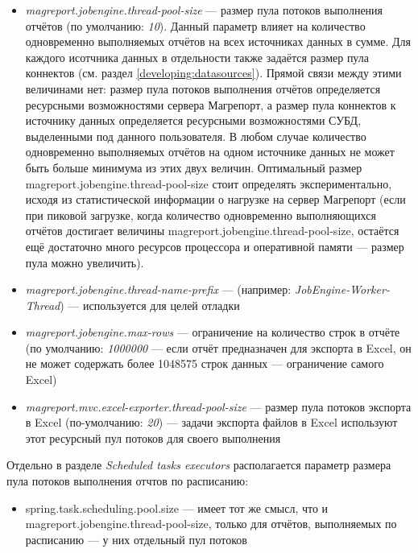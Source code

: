 \documentclass[../user-manual.tex]{subfiles}
\begin{document}
	\begin{itemize}
		\item \textit{magreport.jobengine.thread-pool-size} --- размер пула потоков выполнения отчётов (по умолчанию: \textit{10}). Данный параметр влияет на количество одновременно выполняемых отчётов на всех источниках данных в сумме. Для каждого исотчника данных в отдельности также задаётся размер пула коннектов (см. раздел \ref{developing:datasources}). Прямой связи между этими величинами нет: размер пула потоков выполнения отчётов определяется ресурсными возможностями сервера Магрепорт, а размер пула коннектов к источнику данных определяется ресурсными возможностями СУБД, выделенными под данного пользователя. В любом случае количество одновременно выполняемых отчётов на одном источнике данных не может быть больше минимума из этих двух величин. Оптимальный размер magreport.jobengine.thread-pool-size стоит определять экспериментально, исходя из статистической информации о нагрузке на сервер Магрепорт (если при пиковой загрузке, когда количество одновременно выполняющихся отчётов достигает величины magreport.jobengine.thread-pool-size, остаётся ещё достаточно много ресурсов процессора и оперативной памяти --- размер пула можно увеличить).
		
		\item \textit{magreport.jobengine.thread-name-prefix} --- (например: \textit{JobEngine-Worker-Thread}) --- используется для целей отладки
		
		\item \textit{magreport.jobengine.max-rows} --- ограничение на количество строк в отчёте (по умолчанию: \textit{1000000} --- если отчёт предназначен для экспорта в Excel, он не может содержать более 1048575 строк данных --- ограничение самого Excel)
		
		\item \textit{magreport.mvc.excel-exporter.thread-pool-size} --- размер пула потоков экспорта в Excel (по-умолчанию: \textit{20}) --- задачи экспорта файлов в Excel используют этот ресурсный пул потоков для своего выполнения
	\end{itemize}

	Отдельно в разделе \textit{Scheduled tasks executors} располагается параметр размера пула потоков выполнения отчтов по расписанию:
	
	\begin{itemize}
		\item spring.task.scheduling.pool.size --- имеет тот же смысл, что и magreport.jobengine.thread-pool-size, только для отчётов, выполняемых по расписанию --- у них отдельный пул потоков
	\end{itemize}
	
\end{document}
